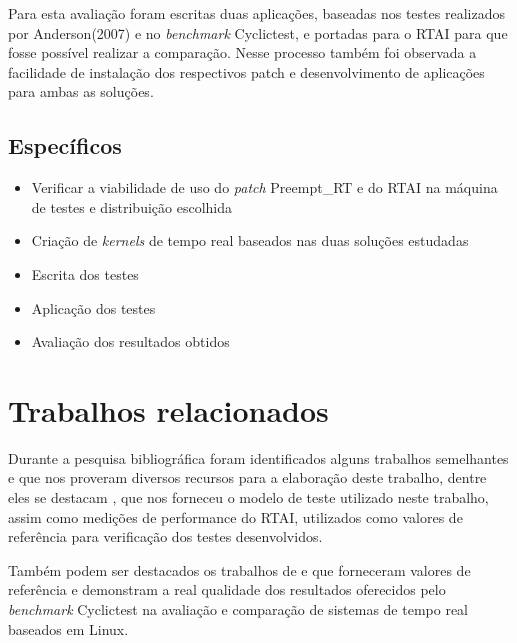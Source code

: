 Para esta avaliação foram escritas duas aplicações, baseadas nos testes realizados por
Anderson(2007) e no \textit{benchmark} Cyclictest, e portadas para o RTAI para que fosse possível realizar a
comparação. Nesse processo também foi observada a facilidade de instalação dos respectivos patch e
desenvolvimento de aplicações para ambas as soluções.
\subsection{Específicos}
\begin{itemize}
    \item Verificar a viabilidade de uso do \textit{patch} Preempt\_RT e do RTAI na máquina de testes e distribuição escolhida
    \item Criação de \textit{kernels} de tempo real baseados nas duas soluções estudadas
    \item Escrita dos testes
    \item Aplicação dos testes
    \item Avaliação dos resultados obtidos
\end{itemize}

\section{Trabalhos relacionados}
Durante a pesquisa bibliográfica foram identificados alguns trabalhos semelhantes e que nos proveram diversos recursos para a elaboração deste trabalho, dentre eles se destacam \cite{Anderson2007}, que nos forneceu o modelo de teste utilizado neste trabalho, assim como medições de performance do RTAI, utilizados como valores de referência para verificação dos testes desenvolvidos.

Também podem ser destacados os trabalhos de \cite{Litayem2011} e \cite{Hallberg2017} que forneceram valores de referência e demonstram a real qualidade dos resultados oferecidos pelo \textit{benchmark} Cyclictest na avaliação e comparação de sistemas de tempo real baseados em Linux.

